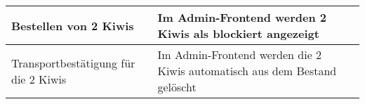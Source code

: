 \begin{table}[H]
\begin{small}
\begin{center}
\begin{tabularx}{\textwidth}{|X|X|L{2cm}|}
	Bestellen von 2 Kiwis &
	Im Admin-Frontend werden 2 Kiwis als blockiert angezeigt &
	\\ \hline
	
	Transportbestätigung für die 2 Kiwis &
	Im Admin-Frontend werden die 2 Kiwis automatisch aus dem Bestand gelöscht & 
	\\ \hline
	
	\end{tabularx}
	\label{tabl:Testprotokoll vom XX.06.2017}
	\end{center}
\end{small}
\end{table}

 